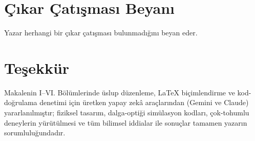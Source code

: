 \documentclass[journal]{IEEEtran}
\begin{document}
\section*{{\c{C}}\i{}kar {\c{C}}at\i{}\c{s}mas\i{} Beyan\i{}}
Yazar herhangi bir \c{c}\i{}kar \c{c}at\i{}\c{s}mas\i{} bulunmad\i{}\u{g}\i{}n\i{} beyan eder.

\section*{Te\c{s}ekk\"ur}
Makalenin I--VI. B\"ol\"umlerinde \"uslup d\"uzenleme, LaTeX bi\c{c}imlendirme ve kod-do\u{g}rulama denetimi i\c{c}in \"uretken yapay zek\^a ara\c{c}lar\i{}ndan (Gemini ve Claude) yararlan\i{}lm\i{}\c{s}t\i{}r; fiziksel tasar\i{}m, dalga-opti\u{g}i sim\"ulasyon kodlar\i{}, \c{c}ok-tohumlu deneylerin y\"ur\"ut\"ulmesi ve t\"um bilimsel iddialar ile sonu\c{c}lar tamamen yazar\i{}n sorumlulu\u{g}undad\i{}r.

\balance


\end{document}
